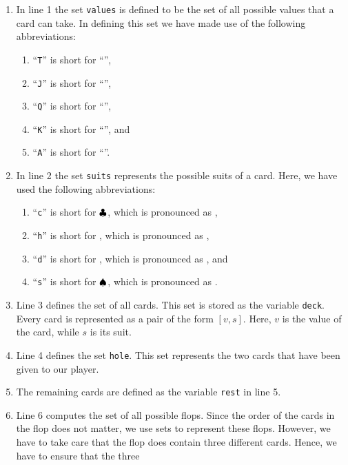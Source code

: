 \begin{enumerate}
\item In line 1 the set \texttt{values} is defined to be the set of all possible values that a card
      can take.  In defining this set we have made use of the following abbreviations:
      \begin{enumerate}
      \item ``\texttt{T}'' is short for ``'',
      \item ``\texttt{J}'' is short for ``'',
      \item ``\texttt{Q}'' is short for ``'',
      \item ``\texttt{K}'' is short for ``'', and
      \item ``\texttt{A}'' is short for ``''.
      \end{enumerate}
\item In line 2 the set \texttt{suits} represents the possible suits of a card.  Here, we have used
      the following abbreviations:
      \begin{enumerate}
      \item ``\texttt{c}'' is short for $\clubsuit $, which is pronounced as ,
      \item ``\texttt{h}'' is short for \mbox{\color{red}{$\heart$}}, which is pronounced as , 
      \item ``\texttt{d}'' is short for \mbox{\color{red}{$\diamondsuit$}}, which is pronounced as , and 
      \item ``\texttt{s}'' is short for $\spadesuit $, which is pronounced as . 
      \end{enumerate} 
\item Line 3 defines the set of all cards.  This set is stored as the variable \texttt{deck}.  Every
      card is represented as a pair of the form $[v,s]$. Here, $v$ is the value of the card, while $s$ is its suit.
\item Line 4 defines the set \texttt{hole}.  This set represents the two cards that have been given to our player.
\item The remaining cards are defined as the variable  \texttt{rest} in line 5.
\item Line 6 computes the set of all possible flops.  Since the order of the cards in the flop does
      not matter, we use sets to represent these flops.  However, we have to take care that the flop
      does contain three \colorbox{amethyst}{different} cards.  Hence, we have to ensure that the three

\end{enumerate}
